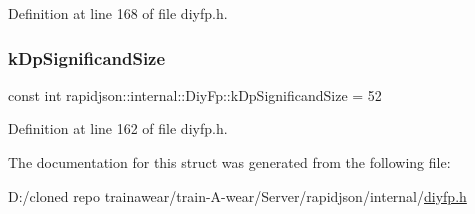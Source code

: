 Definition at line 168 of file diyfp.\+h.

\mbox{\label{structrapidjson_1_1internal_1_1_diy_fp_ad0b9b0e3a66741849b9f640f839976f0}} 
\subsubsection{\texorpdfstring{kDpSignificandSize}{kDpSignificandSize}}
{\footnotesize\ttfamily const int rapidjson\+::internal\+::\+Diy\+Fp\+::k\+Dp\+Significand\+Size = 52\hspace{0.3cm}{\ttfamily [static]}}



Definition at line 162 of file diyfp.\+h.



The documentation for this struct was generated from the following file\+:\begin{DoxyCompactItemize}
\item 
D\+:/cloned repo trainawear/train-\/\+A-\/wear/\+Server/rapidjson/internal/\mbox{\hyperlink{diyfp_8h}{diyfp.\+h}}\end{DoxyCompactItemize}
